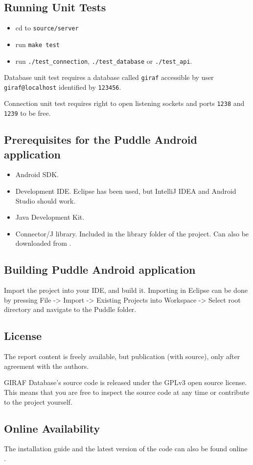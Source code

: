 \subsection{Running Unit Tests}
\begin{itemize}
\item cd to \lstinline|source/server|
\item run \lstinline|make test|
\item run \lstinline|./test_connection|, \lstinline|./test_database| or 
\lstinline|./test_api|.
\end{itemize}
Database unit test requires a database called \lstinline|giraf| accessible by user \lstinline|giraf@localhost| identified by \lstinline|123456|.

Connection unit test requires right to open listening sockets and ports \lstinline|1238| and \lstinline|1239| to be free.

\subsection{Prerequisites for the Puddle Android application}
\begin{itemize}
\item Android SDK.
\item Development IDE. Eclipse has been used, but IntelliJ IDEA and Android Studio should work.
\item Java Development Kit.
\item Connector/J library. Included in the library folder of the project. Can also be downloaded from \citep{mysqlconnectorj}.
\end{itemize}

\subsection{Building Puddle Android application}
Import the project into your IDE, and build it. Importing in Eclipse can be done by pressing File -> Import -> Existing Projects into Workspace -> Select root directory and navigate to the Puddle folder.

\subsection{License}
The report content is freely available, but publication (with source), only after agreement with the authors.

GIRAF Database's source code is released under the GPLv3 \cite{GNUlicense} open source license. This means that you are free to inspect the source code at any time or contribute to the project yourself.

\subsection*{Online Availability} The installation guide and the latest version of the code can also be found online \cite{install}.